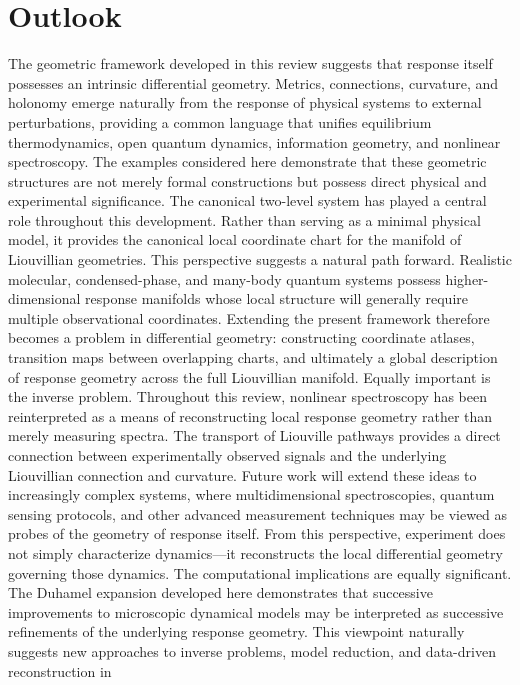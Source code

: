 
\section{Outlook}
\label{sec:outlook}
The geometric framework developed in this review suggests that
response itself possesses an intrinsic differential geometry.
Metrics, connections, curvature, and holonomy emerge naturally
from the response of physical systems to external perturbations,
providing a common language that unifies equilibrium
thermodynamics, open quantum dynamics, information geometry, and
nonlinear spectroscopy. The examples considered here demonstrate
that these geometric structures are not merely formal
constructions but possess direct physical and experimental
significance.
The canonical two-level system has played a central role
throughout this development. Rather than serving as a minimal
physical model, it provides the canonical local coordinate chart
for the manifold of Liouvillian geometries. This perspective
suggests a natural path forward. Realistic molecular,
condensed-phase, and many-body quantum systems possess
higher-dimensional response manifolds whose local structure will
generally require multiple observational coordinates. Extending
the present framework therefore becomes a problem in
differential geometry: constructing coordinate atlases,
transition maps between overlapping charts, and ultimately a
global description of response geometry across the full
Liouvillian manifold.
Equally important is the inverse problem. Throughout this review,
nonlinear spectroscopy has been reinterpreted as a means of
reconstructing local response geometry rather than merely
measuring spectra. The transport of Liouville pathways provides a
direct connection between experimentally observed signals and the
underlying Liouvillian connection and curvature. Future work will
extend these ideas to increasingly complex systems, where
multidimensional spectroscopies, quantum sensing protocols, and
other advanced measurement techniques may be viewed as probes of
the geometry of response itself. From this perspective,
experiment does not simply characterize dynamics—it reconstructs
the local differential geometry governing those dynamics.
The computational implications are equally significant. The
Duhamel expansion developed here demonstrates that successive
improvements to microscopic dynamical models may be interpreted
as successive refinements of the underlying response geometry.
This viewpoint naturally suggests new approaches to inverse
problems, model reduction, and data-driven reconstruction in
